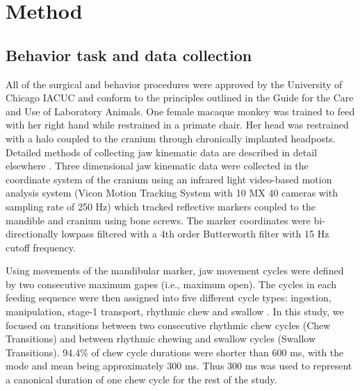 \documentclass[letterpaper, 9pt, conference]{ieeeconf}
\begin{document}
\section{Method}
\label{sec:method}

\subsection{Behavior task and data collection}

All of the surgical and behavior procedures were approved by the University of Chicago IACUC and conform to the principles outlined in the Guide for the Care and Use of Laboratory Animals. One female macaque monkey was trained to feed with her right hand while restrained in a primate chair. Her head was restrained with a halo coupled to the cranium through chronically implanted headposts.
Detailed methods of collecting jaw kinematic data are described in detail elsewhere  \cite{ref:Reed2011,ref:pepe2011}. Three dimensional jaw kinematic data were collected in the coordinate system of the cranium using an infrared light video-based motion analysis system (Vicon Motion Tracking System with 10 MX 40 cameras with sampling rate of 250 Hz) which tracked reflective markers coupled to the mandible and cranium using bone screws. The marker coordinates were bi-directionally lowpass filtered with a 4th order Butterworth filter with 15 Hz cutoff frequency.


Using movements of the mandibular marker, jaw movement cycles were defined by two consecutive maximum gapes (i.e., maximum open). The cycles in each feeding sequence were then assigned into five different cycle types: ingestion, manipulation, stage-1 transport, rhythmic chew and swallow \cite{ref:Thexton1980}. In this study, we focused on transitions between two consecutive rhythmic chew cycles (Chew Transitions) and between rhythmic chewing and swallow cycles (Swallow Transitions). 94.4\% of chew cycle durations were shorter than 600 ms, with the mode and mean being approximately 300 ms. Thus 300 ms was used to represent a canonical duration of one chew cycle for the rest of the study.
\end{document}
